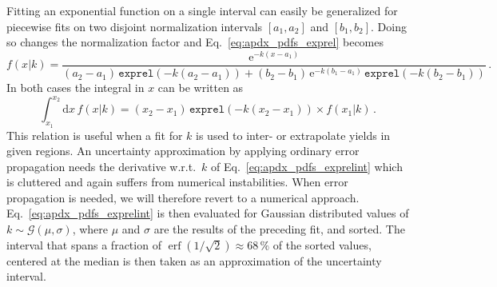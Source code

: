Fitting an exponential function on a single interval can easily be generalized for piecewise fits on two disjoint normalization intervals $[a_1,a_2]$ and $[b_1,b_2]$.
Doing so changes the normalization factor and Eq.~\eqref{eq:apdx_pdfs_exprel} becomes
\begin{equation}
    \label{eq:apdx_pdfs_exprel2}
    f(x|k) = \frac{\mathrm{e}^{-k(x-a_1)}}{(a_2-a_1) \, \texttt{exprel}(-k(a_2-a_1)) + (b_2 - b_1) \, \mathrm{e}^{-k(b_1 - a_1)} \, \texttt{exprel}(-k(b_2-b_1))} \,.
\end{equation}
In both cases the integral in $x$ can be written as
\begin{equation}
    \label{eq:apdx_pdfs_exprelint}
    \int_{x_1}^{x_2} \! \mathrm{d}x \, f(x|k) = (x_2 - x_1) \, \texttt{exprel}\left(-k (x_2 - x_1) \right) \times f(x_1|k) \,.
\end{equation}
This relation is useful when a fit for $k$ is used to inter- or extrapolate yields in given regions.
An uncertainty approximation by applying ordinary error propagation needs the derivative w.r.t.\ $k$ of Eq.~\eqref{eq:apdx_pdfs_exprelint} which is cluttered and again suffers from numerical instabilities.
When error propagation is needed, we will therefore revert to a numerical approach.
Eq.~\eqref{eq:apdx_pdfs_exprelint} is then evaluated for Gaussian distributed values of $k \sim \mathcal{G}(\mu,\sigma)$, where $\mu$ and $\sigma$ are the results of the preceding fit, and sorted.
The interval that spans a fraction of $\operatorname{erf}(1 / \sqrt 2) \approx 68\,\%$ of the sorted values, centered at the median is then taken as an approximation of the uncertainty interval.
